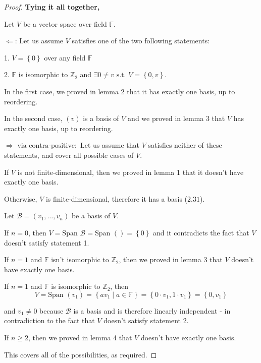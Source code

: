 \documentclass[english]{article}
\theoremstyle{definition}
\theoremstyle{plain}
\theoremstyle{remark}
\theoremstyle{plain}
\theoremstyle{plain}
\begin{document}
\newpage{}
\begin{proof}
\textbf{Tying it all together, }

Let $V$ be a vector space over field $\mathbb{F}$.

$\Leftarrow$: Let us assume $V$ satisfies one of the two following
statements:

1. $V=\left\{ 0\right\} $ over any field $\mathbb{F}$

2. $\mathbb{F}$ is isomorphic to $\mathbb{Z}_{2}$ and $\exists0\ne v\text{ s.t. }V=\left\{ 0,v\right\} $.

In the first case, we proved in lemma 2 that it has exactly one basis,
up to reordering.

In the second case, $\left(v\right)$ is a basis of $V$ and we proved
in lemma 3 that $V$ has exactly one basis, up to reordering.

$\Rightarrow\text{ via contra-positive}:$ Let us assume that $V$
satisfies neither of these statements, and cover all possible cases
of $V$.

If $V$ is not finite-dimensional, then we proved in lemma 1 that
it doesn't have exactly one basis.

Otherwise, $V$ is finite-dimensional, therefore it has a basis ($2.31$).

Let $\mathcal{B}=\left(v_{1},\dots,v_{n}\right)$ be a basis of $V$.

If $n=0$, then $V=\text{Span }\mathcal{B}=\text{Span }\left(\right)=\left\{ 0\right\} $
and it contradicts the fact that $V$ doesn't satisfy statement 1.

If $n=1$ and $\mathbb{F}$ isn't isomorphic to $\mathbb{Z}_{2}$,
then we proved in lemma 3 that $V$ doesn't have exactly one basis.

If $n=1$ and $\mathbb{F}$ is isomorphic to $\mathbb{Z}_{2}$, then
\[
V=\text{Span }\left(v_{1}\right)=\left\{ av_{1}\mid a\in\mathbb{F}\right\} =\left\{ 0\cdot v_{1},1\cdot v_{1}\right\} =\left\{ 0,v_{1}\right\} 
\]

and $v_{1}\ne0$ because $\mathcal{B}$ is a basis and is therefore
linearly independent - in contradiction to the fact that $V$ doesn't
satisfy statement 2.

If $n\ge2$, then we proved in lemma 4 that $V$ doesn't have exactly
one basis.

This covers all of the possibilities, as required. 
\end{proof}
\end{document}
